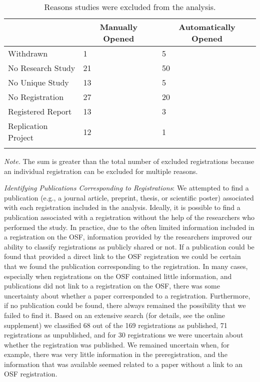 \documentclass[
  ,jou, a4paper,floatsintext]{apa6}
\begin{document}
\begin{table*}[tbp]

\begin{center}
\begin{threeparttable}

\caption{\label{tab:table-excluded}Reasons studies were excluded from the analysis.}

\begin{tabular}{lll}
\toprule
 & \multicolumn{1}{c}{Manually Opened} & \multicolumn{1}{c}{Automatically Opened}\\
\midrule
Withdrawn & 1 & 5\\
No Research Study & 21 & 50\\
No Unique Study & 13 & 5\\
No Registration & 27 & 20\\
Registered Report & 13 & 3\\
Replication Project & 12 & 1\\
\bottomrule
\addlinespace
\end{tabular}

\begin{tablenotes}[para]
\normalsize{\textit{Note.} The sum is greater than the total number of excluded registrations because an individual registration can be excluded for multiple reasons.}
\end{tablenotes}

\end{threeparttable}
\end{center}

\end{table*}

\emph{Identifying Publications Corresponding to Registrations}: We attempted to find a publication (e.g., a journal article, preprint, thesis, or scientific poster) associated with each registration included in the analysis. Ideally, it is possible to find a publication associated with a registration without the help of the researchers who performed the study. In practice, due to the often limited information included in a registration on the OSF, information provided by the researchers improved our ability to classify registrations as publicly shared or not. If a publication could be found that provided a direct link to the OSF registration we could be certain that we found the publication corresponding to the registration. In many cases, especially when registrations on the OSF contained little information, and publications did not link to a registration on the OSF, there was some uncertainty about whether a paper corresponded to a registration. Furthermore, if no publication could be found, there always remained the possibility that we failed to find it. Based on an extensive search (for details, see the online supplement) we classified 68 out of the 169 registrations as published, 71 registrations as unpublished, and for 30 registrations we were uncertain about whether the registration was published. We remained uncertain when, for example, there was very little information in the preregistration, and the information that was available seemed related to a paper without a link to an OSF registration.
\end{document}
